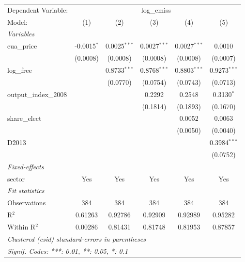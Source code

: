
\begingroup
\centering
\begin{tabular}{lccccc}
   \tabularnewline \midrule \midrule
   Dependent Variable: & \multicolumn{5}{c}{log\_emiss}\\
   Model:                & (1)           & (2)            & (3)            & (4)            & (5)\\  
   \midrule
   \emph{Variables}\\
   eua\_price            & -0.0015$^{*}$ & 0.0025$^{***}$ & 0.0027$^{***}$ & 0.0027$^{***}$ & 0.0010\\   
                         & (0.0008)      & (0.0008)       & (0.0008)       & (0.0008)       & (0.0007)\\   
   log\_free             &               & 0.8733$^{***}$ & 0.8768$^{***}$ & 0.8803$^{***}$ & 0.9273$^{***}$\\   
                         &               & (0.0770)       & (0.0754)       & (0.0743)       & (0.0713)\\   
   output\_index\_2008   &               &                & 0.2292         & 0.2548         & 0.3130$^{*}$\\   
                         &               &                & (0.1814)       & (0.1893)       & (0.1670)\\   
   share\_elect          &               &                &                & 0.0052         & 0.0063\\   
                         &               &                &                & (0.0050)       & (0.0040)\\   
   D2013                 &               &                &                &                & 0.3984$^{***}$\\   
                         &               &                &                &                & (0.0752)\\   
   \midrule
   \emph{Fixed-effects}\\
   sector                & Yes           & Yes            & Yes            & Yes            & Yes\\  
   \midrule
   \emph{Fit statistics}\\
   Observations          & 384           & 384            & 384            & 384            & 384\\  
   R$^2$                 & 0.61263       & 0.92786        & 0.92909        & 0.92989        & 0.95282\\  
   Within R$^2$          & 0.00286       & 0.81431        & 0.81748        & 0.81953        & 0.87857\\  
   \midrule \midrule
   \multicolumn{6}{l}{\emph{Clustered (csid) standard-errors in parentheses}}\\
   \multicolumn{6}{l}{\emph{Signif. Codes: ***: 0.01, **: 0.05, *: 0.1}}\\
\end{tabular}
\par\endgroup



